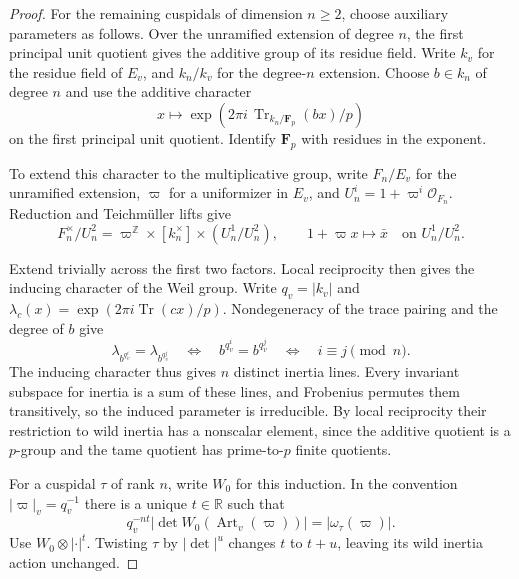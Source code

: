 \begin{proof}

For the remaining cuspidals of dimension
\(n\ge2\), choose auxiliary parameters as follows. Over the unramified extension
of degree \(n\), the first principal unit quotient gives
the additive group of its residue field. Write \(k_v\) for the residue field of \(E_v\),
and \(k_n/k_v\) for the degree-\(n\) extension. Choose \(b\in k_n\)
of degree \(n\) and use the additive character
\[
    x\longmapsto
       \exp(2\pi i\,\operatorname{Tr}_{k_n/\mathbf F_p}(bx)/p)
\]
on the first principal unit quotient. Identify \(\mathbf F_p\)
with residues in the exponent.

To extend this character to the multiplicative group, write \(F_n/E_v\) for the unramified extension, \(\varpi\) for a uniformizer in \(E_v\), and \(U_n^i=1+\varpi^i\mathcal O_{F_n}\). Reduction and Teichm\"uller lifts give
\[
 F_n^\times/U_n^2
   =\varpi^{\mathbb Z}\times [k_n^\times]\times (U_n^1/U_n^2),
 \qquad 1+\varpi x\longmapsto\bar x\quad\text{on }U_n^1/U_n^2.
\]

Extend trivially across the first two factors. Local reciprocity then gives the inducing character of the Weil group. Write \(q_v=|k_v|\) and \(\lambda_c(x)=\exp(2\pi i\operatorname{Tr}(cx)/p)\).
Nondegeneracy of the trace pairing and the degree of \(b\) give
\[
 \lambda_{b^{q_v^i}}=\lambda_{b^{q_v^j}}
 \quad\Longleftrightarrow\quad b^{q_v^i}=b^{q_v^j}
 \quad\Longleftrightarrow\quad i\equiv j\pmod n .
\]
The inducing character thus gives \(n\) distinct inertia lines. Every invariant subspace for inertia
is a sum of these lines, and Frobenius permutes them transitively,
so the induced parameter is irreducible. By local reciprocity their
restriction to wild inertia has a nonscalar element, since
the additive quotient is a \(p\)-group and the tame quotient
has prime-to-\(p\) finite quotients. 

For a cuspidal \(\tau\) of rank \(n\), write \(W_0\) for this induction. In the convention \(|\varpi|_v=q_v^{-1}\) there is a unique \(t\in\mathbb R\) such that
\[
 q_v^{-nt}|\det W_0(\operatorname{Art}_v(\varpi))|
       =|\omega_\tau(\varpi)|.
\]
Use \(W_0\otimes |\cdot|^t\). Twisting \(\tau\) by \(|\det|^u\) changes \(t\) to \(t+u\), leaving its wild inertia action unchanged.


\end{proof}
